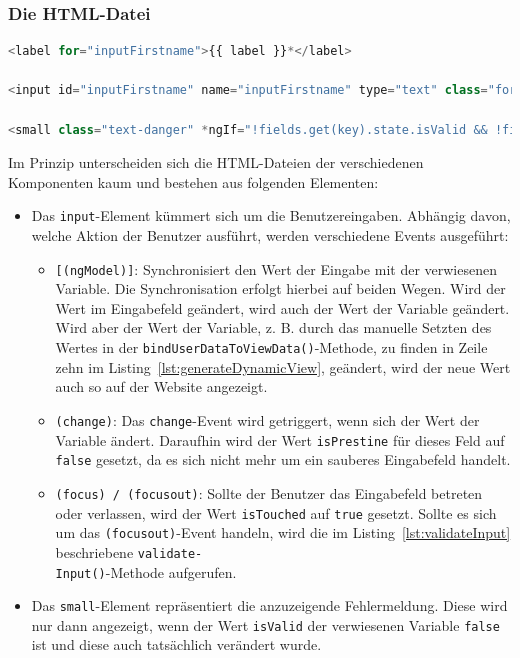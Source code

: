 \subsubsection{Die HTML-Datei}

\begin{lstlisting}[caption={Der HTML-Datei des \texttt{FirstnameComponent}}, language=JavaScript]
<label for="inputFirstname">{{ label }}*</label>

<input id="inputFirstname" name="inputFirstname" type="text" class="form-control" autocomplete="fname" [(ngModel)]="fields.get(key).value" (change)="validatorService.inputChanged(key)" (focus)="onFocusChange($event)" (focusout)="onFocusChange($event)"/>

<small class="text-danger" *ngIf="!fields.get(key).state.isValid && !fields.get(key).state.isPrestine">{{ errorMessage | translate}}</small>
\end{lstlisting}

\newpage

Im Prinzip unterscheiden sich die HTML-Dateien der verschiedenen Komponenten kaum und bestehen aus folgenden Elementen:

\begin{itemize}
	\item Das \texttt{input}-Element kümmert sich um die Benutzereingaben. Abhängig davon, welche Aktion der Benutzer ausführt, werden verschiedene Events ausgeführt:
	
		\begin{itemize}
			\item \texttt{[(ngModel)]}: Synchronisiert den Wert der Eingabe mit der verwiesenen Variable. Die Synchronisation erfolgt hierbei auf beiden Wegen. Wird der Wert im Eingabefeld geändert, wird auch der Wert der Variable geändert. Wird aber der Wert der Variable, z. B. durch das manuelle Setzten des Wertes in der \texttt{bindUserDataToViewData()}-Methode, zu finden in Zeile zehn im Listing~\ref{lst:generateDynamicView}, geändert, wird der neue Wert auch so auf der Website angezeigt. 
			
			\item \texttt{(change)}: Das \texttt{change}-Event wird getriggert, wenn sich der Wert der Variable ändert. Daraufhin wird der Wert \texttt{isPrestine} für dieses Feld auf \texttt{false} gesetzt, da es sich nicht mehr um ein sauberes Eingabefeld handelt.
			
			\item \texttt{(focus) / (focusout)}:  Sollte der Benutzer das Eingabefeld betreten oder verlassen, wird der  Wert \texttt{isTouched} auf \texttt{true} gesetzt. Sollte es sich um das \texttt{(focusout)}-Event handeln, wird die im Listing~\ref{lst:validateInput} beschriebene \texttt{validate-\\Input()}-Methode aufgerufen.
		\end{itemize} 
	
	\item Das \texttt{small}-Element repräsentiert die anzuzeigende Fehlermeldung. Diese wird nur dann angezeigt, wenn der Wert \texttt{isValid} der verwiesenen Variable \texttt{false} ist und diese auch tatsächlich verändert wurde. 
\end{itemize}

